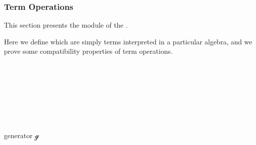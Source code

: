 \subsubsection{Term Operations}\label{term-operations}

This section presents the \ualibOperations module of the \agdaualib.

Here we define  which are simply terms interpreted in a particular algebra, and we prove some compatibility properties of term operations.
\ccpad
\begin{code}%
\>[0]\AgdaSymbol{\{-\#}\AgdaSpace{}%
\AgdaSpace{}%
\AgdaSpace{}%
\AgdaSpace{}%
\AgdaSpace{}%
\AgdaSymbol{\#-\}}\<%
\\
%
\\[\AgdaEmptyExtraSkip]%
\>[0]\AgdaSpace{}%
\AgdaSpace{}%
\AgdaSpace{}%
\AgdaSpace{}%
\AgdaSymbol{(}\AgdaSymbol{;}\AgdaSpace{}%
\AgdaSymbol{;}\AgdaSpace{}%
\AgdaSymbol{)}\<%
\\
\>[0]\AgdaSpace{}%
\AgdaSpace{}%
\AgdaSpace{}%
\AgdaSpace{}%
\AgdaSymbol{(}\AgdaSymbol{)}\<%
\\
%
\\[\AgdaEmptyExtraSkip]%
\>[0]\AgdaSpace{}%
\AgdaSpace{}%
\AgdaSymbol{\{}\AgdaSpace{}%
\AgdaSymbol{:}\AgdaSpace{}%
\AgdaSpace{}%
\AgdaSpace{}%
\AgdaSymbol{\}\{}\AgdaSpace{}%
\AgdaSymbol{:}\AgdaSpace{}%
\AgdaSymbol{\}}\AgdaSpace{}%
\<%
\\
%
\\[\AgdaEmptyExtraSkip]%
\>[0]\AgdaSpace{}%
\AgdaSpace{}%
\AgdaSymbol{\{}\AgdaSpace{}%
\AgdaSymbol{=}\AgdaSpace{}%
\AgdaSymbol{\}\{}\AgdaSymbol{\}}\AgdaSpace{}%
\AgdaSpace{}%
\AgdaSymbol{(}generator  ℊ\AgdaSymbol{)}\AgdaSpace{}%
\<%
\\
\>[0]\<%
\end{code}

